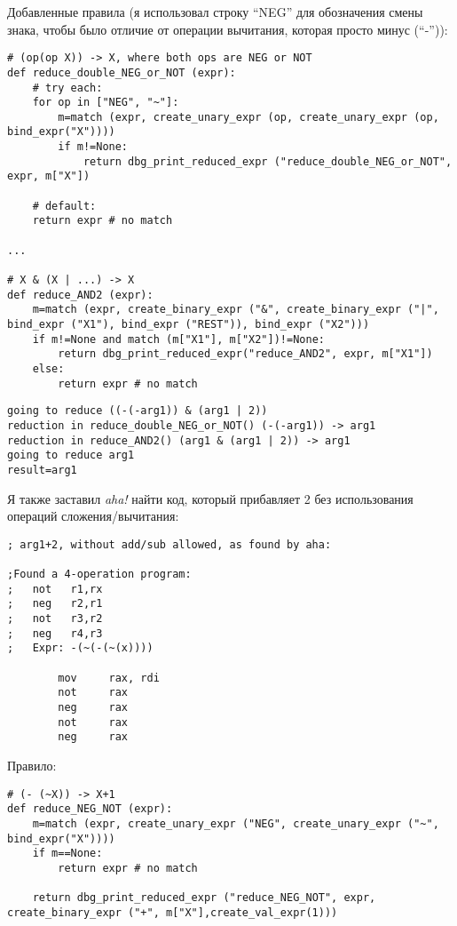 Добавленные правила (я использовал строку ``NEG'' для обозначения смены знака, чтобы было отличие от операции вычитания,
которая просто минус (``-'')):

\label{AND2}
\begin{lstlisting}
# (op(op X)) -> X, where both ops are NEG or NOT
def reduce_double_NEG_or_NOT (expr):
    # try each:
    for op in ["NEG", "~"]:
        m=match (expr, create_unary_expr (op, create_unary_expr (op, bind_expr("X"))))
        if m!=None:
            return dbg_print_reduced_expr ("reduce_double_NEG_or_NOT", expr, m["X"])

    # default:
    return expr # no match

...

# X & (X | ...) -> X
def reduce_AND2 (expr):
    m=match (expr, create_binary_expr ("&", create_binary_expr ("|", bind_expr ("X1"), bind_expr ("REST")), bind_expr ("X2")))
    if m!=None and match (m["X1"], m["X2"])!=None:
        return dbg_print_reduced_expr("reduce_AND2", expr, m["X1"])
    else:
        return expr # no match
\end{lstlisting}

\begin{lstlisting}
going to reduce ((-(-arg1)) & (arg1 | 2))
reduction in reduce_double_NEG_or_NOT() (-(-arg1)) -> arg1
reduction in reduce_AND2() (arg1 & (arg1 | 2)) -> arg1
going to reduce arg1
result=arg1
\end{lstlisting}

Я также заставил \textit{aha!} найти код, который прибавляет 2 без использования операций сложения/вычитания:

\begin{lstlisting}
; arg1+2, without add/sub allowed, as found by aha:

;Found a 4-operation program:
;   not   r1,rx
;   neg   r2,r1
;   not   r3,r2
;   neg   r4,r3
;   Expr: -(~(-(~(x))))

        mov     rax, rdi
        not     rax
        neg     rax
        not     rax
        neg     rax
\end{lstlisting}

Правило:

\begin{lstlisting}
# (- (~X)) -> X+1
def reduce_NEG_NOT (expr):
    m=match (expr, create_unary_expr ("NEG", create_unary_expr ("~", bind_expr("X"))))
    if m==None:
        return expr # no match
    
    return dbg_print_reduced_expr ("reduce_NEG_NOT", expr, create_binary_expr ("+", m["X"],create_val_expr(1)))
\end{lstlisting}

